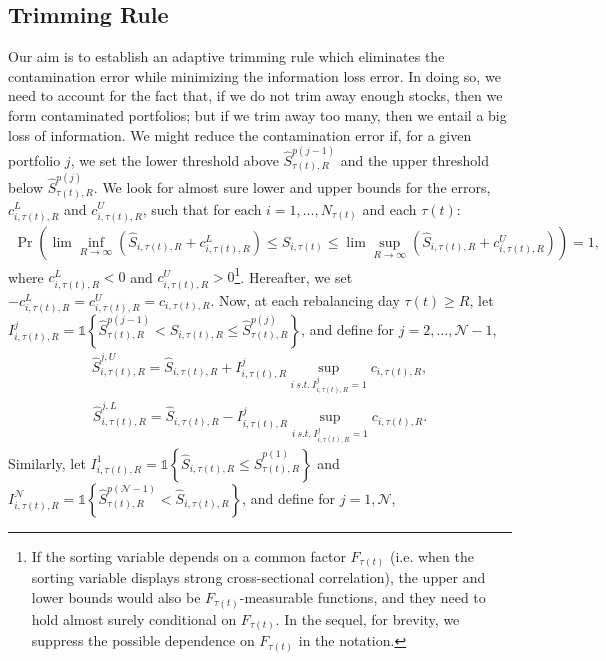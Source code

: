 \subsection{Trimming Rule}

Our aim is to establish an adaptive trimming rule which eliminates the contamination error while minimizing the information loss error. In doing so, we need to account for the fact that, if we do not trim away enough stocks, then we form contaminated portfolios; but if we trim away too many, then we entail a big loss of information. We might reduce the contamination error if, for a given portfolio $j$, we set the lower threshold above $\widehat{S}_{\tau(t),R}^{p(j-1)}$ and the upper threshold below $\widehat{S}_{\tau(t),R}^{p(j)}$. We look for almost sure lower and upper bounds for the errors, $c^L_{i,\tau(t),R}$ and $c^U_{i,\tau(t),R}$, such that for each $i=1,\dots,N_{\tau(t)}$ and each $\tau(t)$: 
\begin{align}
\label{almostsurebounds}
	\mathrm{\Pr} \left( \lim \inf_{R \to \infty} \left( \widehat{S}_{i,\tau(t),R} + c^L_{i,\tau(t),R} \right) \leq S_{i,\tau(t)} \leq \lim \sup_{R \to \infty} \left( \widehat{S}_{i,\tau(t),R} + c^U_{i,\tau(t),R} \right) \right) = 1,
\end{align}
where $c^L_{i,\tau(t),R} < 0$ and $c^U_{i,\tau(t),R} > 0$\footnote{If the sorting variable depends on a common factor $F_{\tau(t)}$ (i.e. when the sorting variable displays strong cross-sectional correlation), the upper and lower bounds would also be $F_{\tau(t)}$-measurable functions, and they need to hold almost surely conditional on $F_{\tau(t)}$. In the sequel, for brevity, we suppress the possible dependence on $F_{\tau(t)}$ in the notation.
}. Hereafter, we set $- c^L_{i,\tau(t),R} = c^U_{i,\tau(t),R} = c_{i,\tau(t),R}$. Now, at each rebalancing day $\tau(t) \geq R$, let $I_{i,\tau(t),R}^j = \mathds{1} \left\{ \widehat{S}_{\tau(t),R}^{p(j-1)} <\widehat{S}_{i,\tau(t),R} \leq \widehat{S}_{\tau(t),R}^{p(j)} \right\}$, and define for $j=2,\dots,\mathcal{N}-1$, 
\begin{align*}
	\widehat{S}_{i,\tau(t),R}^{j,U} = \widehat{S}_{i,\tau(t),R} + I_{i,\tau(t),R}^j \sup_{i \ s.t. \ I_{i,\tau(t),R}^j = 1} c_{i,\tau(t),R},
\end{align*}
\begin{align*}
	\widehat{S}_{i,\tau(t),R}^{j,L} = \widehat{S}_{i,\tau(t),R} - I_{i,\tau(t),R}^j \sup_{i \ s.t. \ I_{i,\tau(t),R}^j = 1} c_{i,\tau(t),R}.
\end{align*}
Similarly, let $I_{i,\tau(t),R}^1 = \mathds{1} \left\{ \widehat{S}_{i,\tau(t),R} \leq \widehat{S}_{\tau(t),R}^{p(1)} \right\}$ and $I_{i,\tau(t),R}^\mathcal{N} = \mathds{1} \left\{ \widehat{S}_{\tau(t),R}^{p(\mathcal{N}-1)} < \widehat{S}_{i,\tau(t),R} \right\}$, and define for $j=1, \mathcal{N}$,
